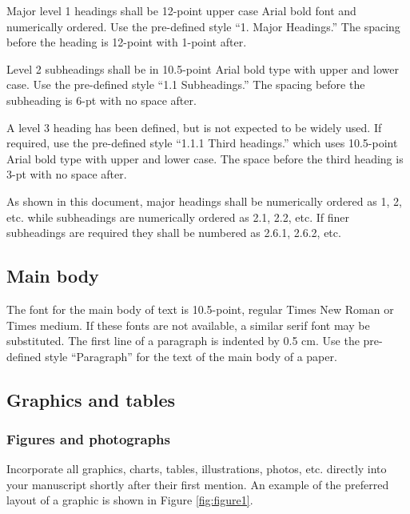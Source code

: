 Major level 1 headings shall be 12-point upper case Arial bold font and numerically ordered. Use the pre-defined style ``1. Major Headings.'' The spacing before the heading is 12-point with 1-point after.

Level 2 subheadings shall be in 10.5-point Arial bold type with upper and lower case. Use the pre-defined style ``1.1 Subheadings.'' The spacing before the subheading is 6-pt with no space after. 

A level 3 heading has been defined, but is not expected to be widely used. If required, use the pre-defined style ``1.1.1 Third headings.'' which uses 10.5-point Arial bold type with upper and lower case. The space before the third heading is 3-pt with no space after.

As shown in this document, major headings shall be numerically ordered as 1, 2, etc. while subheadings are numerically ordered as 2.1, 2.2, etc. If finer subheadings are required they shall be numbered as 2.6.1, 2.6.2, etc.

\subsection{Main body}

The font for the main body of text is 10.5-point, regular Times New Roman or Times medium. If these fonts are not available, a similar serif font may be substituted. The first line of a paragraph is indented by 0.5 cm. Use the pre-defined style ``Paragraph'' for the text of the main body of a paper.

\subsection{Graphics and tables}

\subsubsection{Figures and photographs}

Incorporate all graphics, charts, tables, illustrations, photos, etc. directly into your manuscript shortly after their first mention. An example of the preferred layout of a graphic is shown in Figure \ref{fig:figure1}.

